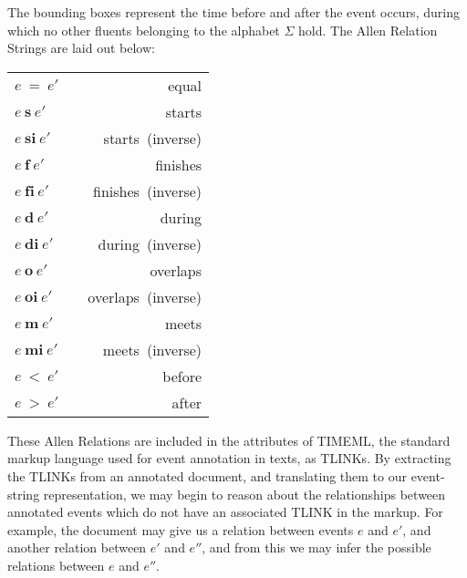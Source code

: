 \documentclass[a4paper,11pt]{article}
\newcommand{\vph}[1]{\vphantom{#1}}
\begin{document}
The bounding boxes represent the time 
before and after the event occurs, during which no other fluents belonging to 
the alphabet $\Sigma$ 
hold. The 
Allen Relation Strings are laid out 
below:
\begin{center}
	\begin{tabular}{ l@{\hskip 1in}c@{\hskip 1in}r }
		$e~\mathbf{=}~e'$ & \fbox{\vph{$e'\vph{,e'}$}}\fbox{$e, 	
		e'\vph{e'}$}\fbox{\vph{$,e'$}} & equal\\[0.6em]		
		$e~\mathbf{s}~e'$ & \fbox{\vph{$e'\vph{,e'}$}}\fbox{$e, 
		e'\vph{e'}$}\fbox{$e'\vph{,e'}$}\fbox{\vph{$,e'$}} & starts\\[0.6em]
		$e~\mathbf{si}~e'$ & \fbox{\vph{$e'\vph{,e'}$}}\fbox{$e, 		
		e'\vph{e'}$}\fbox{$e\vph{,e'}$}\fbox{\vph{$,e'$}} & 		
		starts~(inverse)\\[0.6em]
		$e~\mathbf{f}~e'$ & \fbox{\vph{$e'\vph{,e'}$}}\fbox{$ 		
		e'\vph{,e'}$}\fbox{$e, e'\vph{,e'}$}\fbox{\vph{$,e'$}} & 		
		finishes\\[0.6em]
		$e~\mathbf{fi}~e'$ & \fbox{\vph{$e'\vph{,e'}$}}\fbox{$ 		
		e\vph{,e'}$}\fbox{$e, e'\vph{,e'}$}\fbox{\vph{$,e'$}} &		
		finishes~(inverse)\\[0.6em]
		$e~\mathbf{d}~e'$ & \fbox{\vph{$,e'$}}\fbox{$ e'\vph{,e'}$}\fbox{$e, 
		e'\vph{,e'}$}\fbox{$ e'\vph{,e'}$}\fbox{\vph{$,e'$}} & during\\[0.6em]
		$e~\mathbf{di}~e'$ & \fbox{\vph{$e'\vph{,e'}$}}\fbox{$ 
		e\vph{,e'}$}\fbox{$e, e'\vph{,e'}$}\fbox{$ 
		e\vph{,e'}$}\fbox{\vph{$,e'$}} & during~(inverse)\\[0.6em]
		$e~\mathbf{o}~e'$ & \fbox{\vph{$,e'$}}\fbox{$ e\vph{,e'}$}\fbox{$e, 
		e'\vph{,e'}$}\fbox{$ e'\vph{,e'}$}\fbox{\vph{$,e'$}} & 
		overlaps\\[0.6em]
		$e~\mathbf{oi}~e'$ & \fbox{\vph{$e'\vph{,e'}$}}\fbox{$ 
		e'\vph{,e'}$}\fbox{$e, e'\vph{,e'}$}\fbox{$ 
		e\vph{,e'}$}\fbox{\vph{$,e'$}} & overlaps~(inverse)\\[0.6em]
		$e~\mathbf{m}~e'$ & \fbox{\vph{$,e'$}}\fbox{$ e\vph{,e'}$}\fbox{$ 
		e'\vph{,e'}$}\fbox{\vph{$,e'$}} & meets\\[0.6em]
		$e~\mathbf{mi}~e'$ & \fbox{\vph{$e'\vph{,e'}$}}\fbox{$ 
		e'\vph{,e'}$}\fbox{$ e\vph{,e'}$}\fbox{\vph{$,e'$}} & 
		meets~(inverse)\\[0.6em]
		$e~\mathbf{<}~e'$ & \fbox{\vph{$,e'$}}\fbox{$ 
		e\vph{,e'}$}\fbox{$\vph{,e'}$}\fbox{$ e'\vph{,e'}$}\fbox{\vph{$,e'$}} & 
		before\\[0.6em]
		$e~\mathbf{>}~e'$ & \fbox{\vph{$e'\vph{,e'}$}}\fbox{$ 
		e'\vph{,e'}$}\fbox{$\vph{,e'}$}\fbox{$ e\vph{,e'}$}\fbox{\vph{$,e'$}} & 
		after
	\end{tabular}
\end{center}
These Allen Relations are included in the attributes of TIMEML, the standard 
markup language used for event annotation in texts, as TLINKs. By extracting 
the TLINKs from an annotated document, and translating them to our event-string 
representation, we may begin to reason about the relationships between 
annotated events which do not have an associated TLINK in the markup. For 
example, the document may give us a relation between events $e$ and $e'$, and 
another relation between $e'$ and $e''$, and from this we may infer the 
possible 
relations between $e$ and $e''$.
\end{document}
